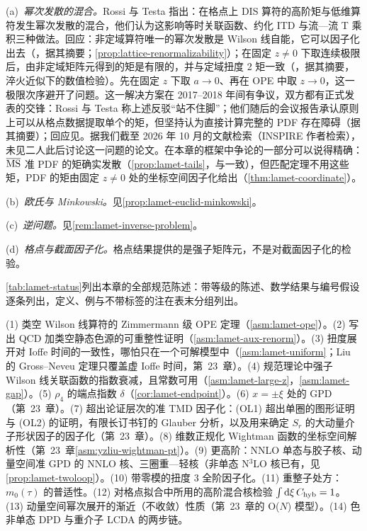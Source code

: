 \begin{remark}[批评与回应]\label{rem:lattice-critiques}
(a)~\emph{幂次发散的混合。}Rossi 与 Testa 指出\cite{Rossi:2017muf,Rossi:2018zkn}：在格点上 DIS 算符的高阶矩与低维算符发生幂次发散的混合，他们认为这影响等时关联函数、约化 ITD 与流—流 T 乘积三种做法。回应：非定域算符唯一的幂次发散是 Wilson 线自能，它可以因子化出去（\cite{Ji:2017rah}，据其摘要；\cref{prop:lattice-renormalizability}）；在固定 $z\neq0$ 下取连续极限后，由非定域矩阵元得到的矩是有限的，并与定域扭度 2 矩一致（\cite{Karpie:2018zaz}，据其摘要，淬火近似下的数值检验）。先在固定 $z$ 下取 $a\to0$、再在 OPE 中取 $z\to0$，这一极限次序避开了问题。这一解决方案在 2017--2018 年间有争议，双方都有正式发表的交锋：Rossi 与 Testa 称上述反驳“站不住脚”\cite[第~3.1~节]{Rossi:2018zkn}；他们随后的会议报告承认原则上可以从格点数据提取单个的矩，但坚持认为直接计算完整的 PDF 存在障碍\cite{Rossi:2018stq}（据其摘要）；回应见\cite{Karpie:2018zaz,Radyushkin:2018nbf}。据我们截至 2026 年 10 月的文献检索（INSPIRE 作者检索），未见二人此后讨论这一问题的论文。在本章的框架中争论的一部分可以说得精确：$\overline{\mathrm{MS}}$ 准 PDF 的矩确实发散（\cref{prop:lamet-tails}，与\cite{Radyushkin:2018nbf}一致），但匹配定理不用这些矩，PDF 的矩由固定 $z\neq0$ 处的坐标空间因子化给出（\cref{thm:lamet-coordinate}）。

(b)~\emph{欧氏与 Minkowski。}见\cref{prop:lamet-euclid-minkowski}。

(c)~\emph{逆问题。}见\cref{rem:lamet-inverse-problem}。

(d)~\emph{格点与截面因子化。}格点结果提供的是强子矩阵元，不是对截面因子化的检验。
\end{remark}

\cref{tab:lamet-status}列出本章的全部规范陈述：带等级的陈述、数学结果与编号假设逐条列出，定义、例与不带标签的注在表末分组列出。

\begin{remark}[开放问题]\label{rem:lamet-open}
(1) 类空 Wilson 线算符的 Zimmermann 级 OPE 定理（\cref{asm:lamet-ope}）。(2) 写出 QCD 加类空静态色源的可重整性证明（\cref{asm:lamet-aux-renorm}）。(3) 扭度展开对 Ioffe 时间的一致性，哪怕只在一个可解模型中（\cref{asm:lamet-uniform}；Liu 的 Gross--Neveu 定理只覆盖虚 Ioffe 时间，第~23~章）。(4) 规范理论中强子 Wilson 线关联函数的指数衰减，且常数可用（\cref{asm:lamet-large-z}，\cref{asm:lamet-gap}）。(5) $\rho_4$ 的端点指数 $\delta$（\cref{cor:lamet-endpoint}）。(6) $x=\pm\xi$ 处的 GPD（第~23~章）。(7) 超出论证层次的准 TMD 因子化：(OL1) 超出单圈的图形证明与 (OL2) 的证明，有限长订书钉的 Glauber 分析，以及用来确定 $S_r$ 的大动量介子形状因子的因子化（第~23~章）。(8) 维数正规化 Wightman 函数的坐标空间解析性（第~23~章\cref{asm:yzliu-wightman-pt}）。(9) 更高阶：NNLO 单态与胶子核、动量空间准 GPD 的 NNLO 核、三圈重—轻核（非单态 N$^3$LO 核已有\cite{Cheng:2024wyu}，见\cref{prop:lamet-twoloop}）。(10) 带零模的扭度 3 全阶因子化。(11) 重整子处方：$m_0(\tau)$ 的普适性。(12) 对格点拟合中所用的高阶混合核检验 $\int\mathrm{d}\xi\,C_{\rm hyb}=1$。(13) 动量空间幂次展开的渐近（不收敛）性质（第~23~章的 O($N$) 模型）。(14) 色非单态 DPD 与重介子 LCDA 的两步链。
\end{remark}

